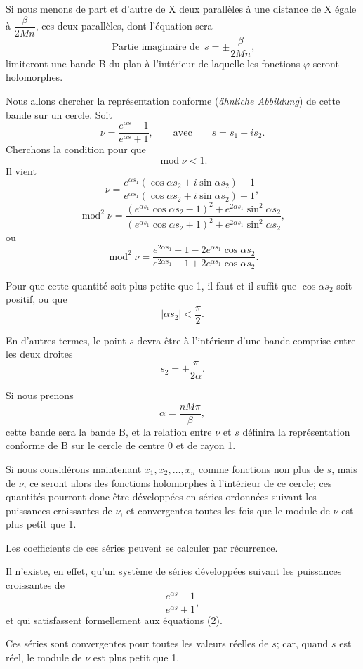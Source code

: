 \documentclass[11pt]{article}
\begin{document}
Si nous menons de part et d’autre de X deux parallèles à une distance de X égale à $\dfrac{\beta}{2Mn}$, ces deux parallèles, dont l’équation sera
\[
\operatorname{Partie\ imaginaire\ de}\ s=\pm\frac{\beta}{2Mn},
\]
limiteront une bande B du plan à l’intérieur de laquelle les fonctions $\varphi$ seront holomorphes.

Nous allons chercher la représentation conforme (\emph{ähnliche Abbildung}) de cette bande sur un cercle. Soit
\[
\nu=\frac{e^{\alpha s}-1}{e^{\alpha s}+1},\qquad \text{avec}\qquad s=s_1+is_2.
\]
Cherchons la condition pour que
\[
\operatorname{mod}\nu<1.
\]
Il vient
\[
\nu=\frac{e^{\alpha s_1}(\cos \alpha s_2+i\sin \alpha s_2)-1}{e^{\alpha s_1}(\cos \alpha s_2+i\sin \alpha s_2)+1},
\]
\[
\operatorname{mod}^2\nu=\frac{(e^{\alpha s_1}\cos\alpha s_2-1)^2+e^{2\alpha s_1}\sin^2\alpha s_2}{(e^{\alpha s_1}\cos\alpha s_2+1)^2+e^{2\alpha s_1}\sin^2\alpha s_2},
\]
ou
\[
\operatorname{mod}^2\nu=\frac{e^{2\alpha s_1}+1-2e^{\alpha s_1}\cos\alpha s_2}{e^{2\alpha s_1}+1+2e^{\alpha s_1}\cos\alpha s_2}.
\]

Pour que cette quantité soit plus petite que 1, il faut et il suffit que $\cos\alpha s_2$ soit positif, ou que
\[
|\alpha s_2|<\frac{\pi}{2}.
\]

En d’autres termes, le point $s$ devra être à l’intérieur d’une bande comprise entre les deux droites
\[
s_2=\pm\frac{\pi}{2\alpha}.
\]

Si nous prenons
\[
\alpha=\frac{nM\pi}{\beta},
\]
cette bande sera la bande B, et la relation entre $\nu$ et $s$ définira la représentation conforme de B sur le cercle de centre 0 et de rayon 1.

Si nous considérons maintenant $x_1,x_2,\ldots,x_n$ comme fonctions non plus de $s$, mais de $\nu$, ce seront alors des fonctions holomorphes à l’intérieur de ce cercle; ces quantités pourront donc être développées en séries ordonnées suivant les puissances croissantes de $\nu$, et convergentes toutes les fois que le module de $\nu$ est plus petit que 1.

Les coefficients de ces séries peuvent se calculer par récurrence.

Il n’existe, en effet, qu’un système de séries développées suivant les puissances croissantes de
\[
\frac{e^{\alpha s}-1}{e^{\alpha s}+1},
\]
et qui satisfassent formellement aux équations (2).

Ces séries sont convergentes pour toutes les valeurs réelles de $s$; car, quand $s$ est réel, le module de $\nu$ est plus petit que 1.
\end{document}
